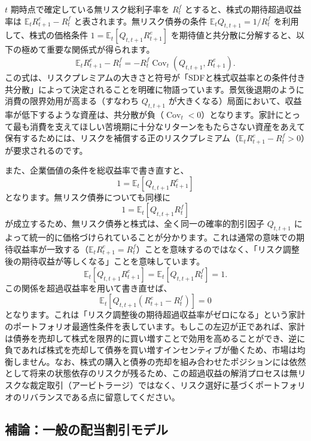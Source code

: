 \documentclass[
  japanese,
  lualatex,
  ja=standard,
  12pt,
  a4paper]{ltjsarticle}
\begin{document}
\(t\) 期時点で確定している無リスク総利子率を \(R_t^f\)
とすると、株式の期待超過収益率は \(\mathbb{E}_t R_{t+1}^e - R_t^f\)
と表されます。無リスク債券の条件 \(\mathbb{E}_t Q_{t,t+1} = 1/R_t^f\)
を利用して、株式の価格条件 \(1 = \mathbb{E}_t[Q_{t,t+1} R_{t+1}^e]\)
を期待値と共分散に分解すると、以下の極めて重要な関係式が得られます。 \[
\mathbb{E}_t R_{t+1}^e - R_t^f = - R_t^f \operatorname{Cov}_t \left( Q_{t,t+1}, R_{t+1}^e \right).
\]
この式は、リスクプレミアムの大きさと符号が「SDFと株式収益率との条件付き共分散」によって決定されることを明確に物語っています。景気後退期のように消費の限界効用が高まる（すなわち
\(Q_{t,t+1}\)
が大きくなる）局面において、収益率が低下するような資産は、共分散が負（\(\operatorname{Cov}_t < 0\)）となります。家計にとって最も消費を支えてほしい苦境期に十分なリターンをもたらさない資産をあえて保有するためには、リスクを補償する正のリスクプレミアム（\(\mathbb{E}_t R_{t+1}^e - R_t^f > 0\)）が要求されるのです。

また、企業価値の条件を総収益率で書き直すと、 \[
1 = \mathbb{E}_t \left[ Q_{t,t+1} R_{t+1}^e \right]
\] となります。無リスク債券についても同様に \[
1 = \mathbb{E}_t \left[ Q_{t,t+1} R_t^f \right]
\] が成立するため、無リスク債券と株式は、全く同一の確率的割引因子
\(Q_{t,t+1}\)
によって統一的に価格づけられていることが分かります。これは通常の意味での期待収益率が一致する（\(\mathbb{E}_t R_{t+1}^e = R_t^f\)）ことを意味するのではなく、「リスク調整後の期待収益が等しくなる」ことを意味しています。
\[
\mathbb{E}_t \left[ Q_{t,t+1} R_{t+1}^e \right] = \mathbb{E}_t \left[ Q_{t,t+1} R_t^f \right] = 1.
\] この関係を超過収益率を用いて書き直せば、 \[
\mathbb{E}_t \left[ Q_{t,t+1} (R_{t+1}^e - R_t^f) \right] = 0
\]
となります。これは「リスク調整後の期待超過収益率がゼロになる」という家計のポートフォリオ最適性条件を表しています。もしこの左辺が正であれば、家計は債券を売却して株式を限界的に買い増すことで効用を高めることができ、逆に負であれば株式を売却して債券を買い増すインセンティブが働くため、市場は均衡しません。なお、株式の購入と債券の売却を組み合わせたポジションには依然として将来の状態依存のリスクが残るため、この超過収益の解消プロセスは無リスクな裁定取引（アービトラージ）ではなく、リスク選好に基づくポートフォリオのリバランスである点に留意してください。

\subsection{補論：一般の配当割引モデル}\label{ux88dcux8ad6ux4e00ux822cux306eux914dux5f53ux5272ux5f15ux30e2ux30c7ux30eb}
\end{document}
